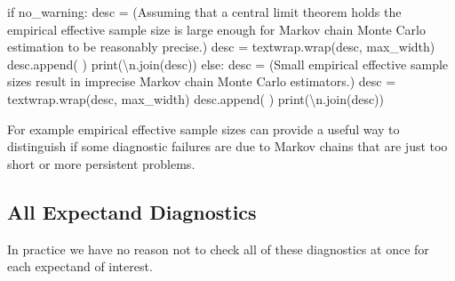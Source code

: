 \documentclass[
  letterpaper,
  DIV=11,
  numbers=noendperiod]{scrartcl}
\newenvironment{Shaded}{\begin{snugshade}}{\end{snugshade}}
\newcommand{\BuiltInTok}[1]{\textcolor[rgb]{0.00,0.23,0.31}{#1}}
\newcommand{\CharTok}[1]{\textcolor[rgb]{0.13,0.47,0.30}{#1}}
\newcommand{\ControlFlowTok}[1]{\textcolor[rgb]{0.00,0.23,0.31}{#1}}
\newcommand{\NormalTok}[1]{\textcolor[rgb]{0.00,0.23,0.31}{#1}}
\newcommand{\OperatorTok}[1]{\textcolor[rgb]{0.37,0.37,0.37}{#1}}
\newcommand{\StringTok}[1]{\textcolor[rgb]{0.13,0.47,0.30}{#1}}
\begin{document}
\begin{Shaded}
\begin{Highlighting}[]
  \ControlFlowTok{if}\NormalTok{ no\_warning:}
\NormalTok{    desc }\OperatorTok{=}\NormalTok{ (}\StringTok{\textquotesingle{}Assuming that a central limit theorem holds the \textquotesingle{}}
            \StringTok{\textquotesingle{}empirical effective sample size is large enough \textquotesingle{}}
            \StringTok{\textquotesingle{}for Markov chain Monte Carlo estimation to be\textquotesingle{}}
            \StringTok{\textquotesingle{}reasonably precise.\textquotesingle{}}\NormalTok{)}
\NormalTok{    desc }\OperatorTok{=}\NormalTok{ textwrap.wrap(desc, max\_width)}
\NormalTok{    desc.append(}\StringTok{\textquotesingle{} \textquotesingle{}}\NormalTok{)}
    \BuiltInTok{print}\NormalTok{(}\StringTok{\textquotesingle{}}\CharTok{\textbackslash{}n}\StringTok{\textquotesingle{}}\NormalTok{.join(desc))}
  \ControlFlowTok{else}\NormalTok{:}
\NormalTok{    desc }\OperatorTok{=}\NormalTok{ (}\StringTok{\textquotesingle{}Small empirical effective sample sizes result in \textquotesingle{}}
            \StringTok{\textquotesingle{}imprecise Markov chain Monte Carlo estimators.\textquotesingle{}}\NormalTok{)}
\NormalTok{    desc }\OperatorTok{=}\NormalTok{ textwrap.wrap(desc, max\_width)}
\NormalTok{    desc.append(}\StringTok{\textquotesingle{} \textquotesingle{}}\NormalTok{)}
    \BuiltInTok{print}\NormalTok{(}\StringTok{\textquotesingle{}}\CharTok{\textbackslash{}n}\StringTok{\textquotesingle{}}\NormalTok{.join(desc))}
\end{Highlighting}
\end{Shaded}

For example empirical effective sample sizes can provide a useful way to
distinguish if some diagnostic failures are due to Markov chains that
are just too short or more persistent problems.

\subsection{All Expectand Diagnostics}\label{all-expectand-diagnostics}

In practice we have no reason not to check all of these diagnostics at
once for each expectand of interest.
\end{document}
